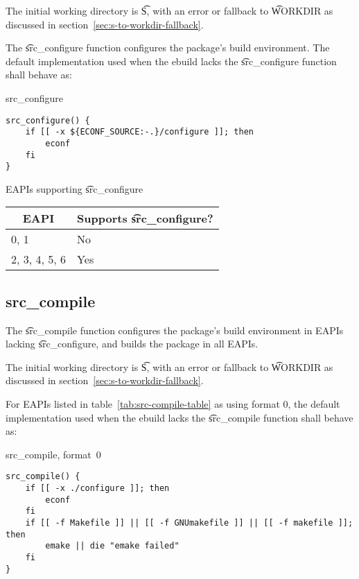The initial working directory is \t{S}, with an error or fallback to \t{WORKDIR} as discussed in
section~\ref{sec:s-to-workdir-fallback}.

The \t{src\_configure} function configures the package's build environment. The default
implementation used when the ebuild lacks the \t{src\_configure} function shall behave as:

\begin{listing}[H]
\caption{src\_configure}
\begin{verbatim}
src_configure() {
    if [[ -x ${ECONF_SOURCE:-.}/configure ]]; then
        econf
    fi
}
\end{verbatim}
\end{listing}

\begin{centertable}{EAPIs supporting \t{src\_configure}}
    \label{tab:src-configure-table}
    \begin{tabular}{ll}
      \toprule
      \multicolumn{1}{c}{\textbf{EAPI}} &
      \multicolumn{1}{c}{\textbf{Supports \t{src\_configure}?}} \\
      \midrule
      0, 1              & No  \\
      2, 3, 4, 5, 6     & Yes \\
      \bottomrule
    \end{tabular}
\end{centertable}

\subsection{src\_compile}

 The \t{src\_compile} function configures the package's build environment
in EAPIs lacking \t{src\_configure}, and builds the package in all EAPIs.

The initial working directory is \t{S}, with an error or fallback to \t{WORKDIR} as discussed in
section~\ref{sec:s-to-workdir-fallback}.

 For EAPIs listed in table~\ref{tab:src-compile-table} as using format
0, the default implementation used when the ebuild lacks the \t{src\_compile} function shall behave
as:

\begin{listing}[H]
\caption{src\_compile, format~0}
\begin{verbatim}
src_compile() {
    if [[ -x ./configure ]]; then
        econf
    fi
    if [[ -f Makefile ]] || [[ -f GNUmakefile ]] || [[ -f makefile ]]; then
        emake || die "emake failed"
    fi
}
\end{verbatim}
\end{listing}

